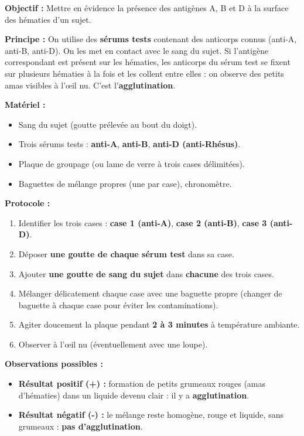 \documentclass[11pt]{article}
\begin{document}
\begin{experience}
\textbf{Objectif :} Mettre en évidence la présence des antigènes A, B et D à la surface des hématies d'un sujet.

\textbf{Principe :} On utilise des \textbf{sérums tests} contenant des anticorps connus (anti-A, anti-B, anti-D). On les met en contact avec le sang du sujet. Si l'antigène correspondant est présent sur les hématies, les anticorps du sérum test se fixent sur plusieurs hématies à la fois et les collent entre elles : on observe des petits amas visibles à l'œil nu. C'est l'\textbf{agglutination}.

\textbf{Matériel :}
\begin{itemize}
    \item Sang du sujet (goutte prélevée au bout du doigt).
    \item Trois sérums tests : \textbf{anti-A}, \textbf{anti-B}, \textbf{anti-D (anti-Rhésus)}.
    \item Plaque de groupage (ou lame de verre à trois cases délimitées).
    \item Baguettes de mélange propres (une par case), chronomètre.
\end{itemize}

\textbf{Protocole :}
\begin{enumerate}
    \item Identifier les trois cases : \textbf{case 1 (anti-A)}, \textbf{case 2 (anti-B)}, \textbf{case 3 (anti-D)}.
    \item Déposer \textbf{une goutte de chaque sérum test} dans sa case.
    \item Ajouter \textbf{une goutte de sang du sujet} dans \textbf{chacune} des trois cases.
    \item Mélanger délicatement chaque case avec une baguette propre (changer de baguette à chaque case pour éviter les contaminations).
    \item Agiter doucement la plaque pendant \textbf{2 à 3 minutes} à température ambiante.
    \item Observer à l'œil nu (éventuellement avec une loupe).
\end{enumerate}

\textbf{Observations possibles :}
\begin{itemize}
    \item \textbf{Résultat positif (+) :} formation de petits grumeaux rouges (amas d'hématies) dans un liquide devenu clair : il y a \textbf{agglutination}.
    \item \textbf{Résultat négatif (-) :} le mélange reste homogène, rouge et liquide, sans grumeaux : \textbf{pas d'agglutination}.
\end{itemize}
\end{experience}
\end{document}
